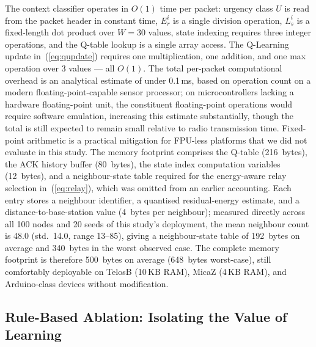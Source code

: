 \documentclass[12pt]{article}
\begin{document}
The context classifier operates in $O(1)$ time per packet: urgency
class $U$ is read from the packet header in constant time, $E_r^i$
is a single division operation, $L_s^i$ is a fixed-length dot product
over $W = 30$ values, state indexing requires three integer
operations, and the Q-table lookup is a single array access. The Q-Learning update in~(\ref{eq:qupdate}) requires one multiplication,
one addition, and one max operation over 3 values --- all $O(1)$.
The total per-packet computational overhead is an analytical estimate
of under 0.1\,ms, based on operation count on a modern
floating-point-capable sensor processor; on microcontrollers lacking
a hardware floating-point unit, the constituent floating-point
operations would require software emulation, increasing this
estimate substantially, though the total is still expected to remain
small relative to radio transmission time. Fixed-point arithmetic is
a practical mitigation for FPU-less platforms that we did not
evaluate in this study. The memory footprint comprises the Q-table
(216~bytes), the ACK history buffer (80~bytes), the state index
computation variables (12~bytes), and a neighbour-state table
required for the energy-aware relay selection in~(\ref{eq:relay}),
which was omitted from an earlier accounting. Each entry stores a
neighbour identifier, a quantised residual-energy estimate, and a
distance-to-base-station value (4~bytes per neighbour); measured
directly across all 100 nodes and 20 seeds of this study's
deployment, the mean neighbour count is 48.0 (std.\ 14.0, range
13--85), giving a neighbour-state table of 192~bytes on average and
340~bytes in the worst observed case. The complete memory footprint
is therefore 500~bytes on average (648~bytes worst-case), still
comfortably deployable on TelosB (10\,KB RAM), MicaZ (4\,KB RAM),
and Arduino-class devices without modification.

\subsection{Rule-Based Ablation: Isolating the Value of Learning}
\label{sec:rule_ablation}
\end{document}

